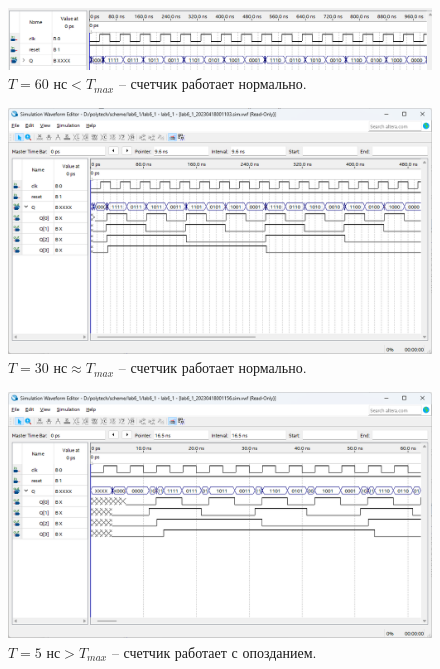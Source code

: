 \documentclass[a4paper,12pt]{article}
\begin{document}
    \begin{figure}[H]
        \centering
        \includegraphics[width=\linewidth]{wave_1__60}
        \caption{$T = 60 \text{ нс} < T_\textit{max}$ -- счетчик работает нормально.}
    \end{figure}
    \begin{figure}[H]
        \centering
        \includegraphics[width=\linewidth]{wave_1__30}
        \caption{$T = 30 \text{ нс} \approx T_\textit{max}$ -- счетчик работает нормально.}
    \end{figure}
    \begin{figure}[H]
        \centering
        \includegraphics[width=\linewidth]{wave_1__5}
        \caption{$T = 5 \text{ нс} > T_\textit{max}$ -- счетчик работает с опозданием.}
    \end{figure}
\end{document}
